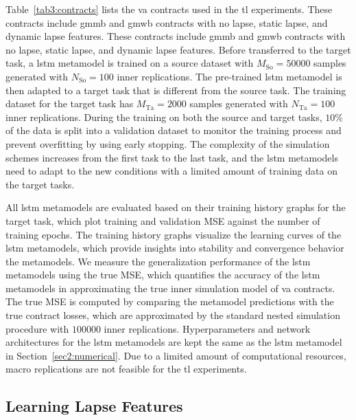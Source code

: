 Table~\ref{tab3:contracts} lists the \gls{va} contracts used in the \gls{tl} experiments.
These contracts include \gls{gmmb} and \gls{gmwb} contracts with no lapse, static lapse, and dynamic lapse features.
These contracts include \gls{gmmb} and \gls{gmwb} contracts with no lapse, static lapse, and dynamic lapse features.
Before transferred to the target task, a \gls{lstm} metamodel is trained on a source dataset with $M_{\text{So}} = \num{50000}$ samples generated with $N_{\text{So}} = \num{100}$ inner replications\footnotemark.
The pre-trained \gls{lstm} metamodel is then adapted to a target task that is different from the source task.
The training dataset for the target task has $M_{\text{Ta}} = \num{2000}$ samples generated with $N_{\text{Ta}} = \num{100}$ inner replications.
During the training on both the source and target tasks, $10\%$ of the data is split into a validation dataset to monitor the training process and prevent overfitting by using early stopping.
The complexity of the simulation schemes increases from the first task to the last task, and the \gls{lstm} metamodels need to adapt to the new conditions with a limited amount of training data on the target tasks.

All \gls{lstm} metamodels are evaluated based on their training history graphs for the target task, which plot training and validation MSE against the number of training epochs.
The training history graphs visualize the learning curves of the \gls{lstm} metamodels, which provide insights into stability and convergence behavior the metamodels.
We measure the generalization performance of the \gls{lstm} metamodels using the true MSE, which quantifies the accuracy of the \gls{lstm} metamodels in approximating the true inner simulation model of \gls{va} contracts.
The true MSE is computed by comparing the metamodel predictions with the true contract losses, which are approximated by the standard nested simulation procedure with $\num{100000}$ inner replications.
Hyperparameters and network architectures for the \gls{lstm} metamodels are kept the same as the \gls{lstm} metamodel in Section~\ref{sec2:numerical}. 
Due to a limited amount of computational resources, macro replications are not feasible for the \gls{tl} experiments.


\subsection{Learning Lapse Features}

